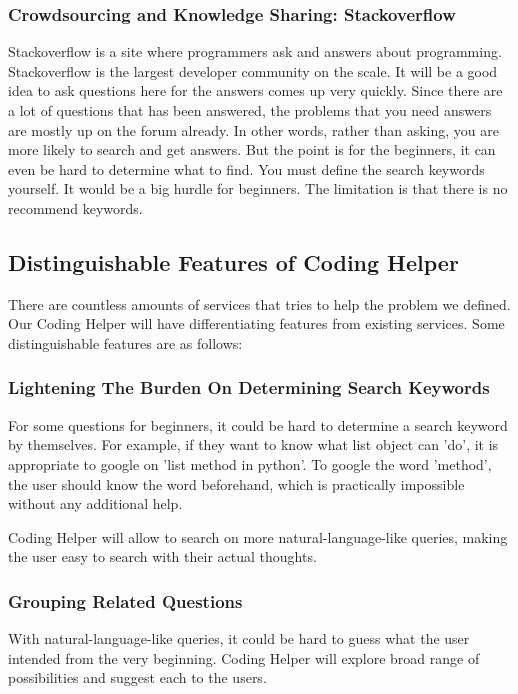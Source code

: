 \documentclass[conference]{IEEEtran}
\begin{document}
\subsubsection{Crowdsourcing and Knowledge Sharing: Stackoverflow}
Stackoverflow is a site where programmers ask and answers about programming. Stackoverflow is the largest developer community on the scale. It will be a good idea to ask questions here for the answers comes up very quickly.
Since there are a lot of questions that has been answered, the problems that you need answers are mostly up on the forum already. In other words, rather than asking, you are more likely to search and get answers. But the point is for the beginners, it can even be hard to determine what to find. You must define the search keywords yourself. It would be a big hurdle for beginners. The limitation is that there is no recommend keywords.

\subsection{Distinguishable Features of Coding Helper} %
\label{sub:distinguishable_features_of_assignment_helper}
There are countless amounts of services that tries to help the problem we defined. Our Coding Helper will have differentiating features from existing services. Some distinguishable features are as follows:

\subsubsection{Lightening The Burden On Determining Search Keywords}
For some questions for beginners, it could be hard to determine a search keyword by themselves. For example, if they want to know what list object can 'do', it is appropriate to google on 'list method in python'. To google the word 'method', the user should know the word beforehand, which is practically impossible without any additional help.


Coding Helper will allow to search on more natural-language-like queries, making the user easy to search with their actual thoughts.

\subsubsection{Grouping Related Questions}
With natural-language-like queries, it could be hard to guess what the user intended from the very beginning. Coding Helper will explore broad range of possibilities and suggest each to the users.
\end{document}
